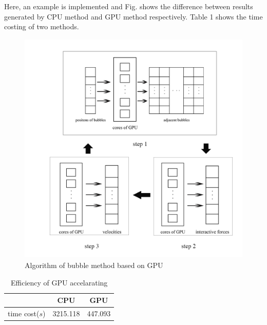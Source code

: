 \documentclass[a4paper, 11pt, final]{article}
\begin{document}
Here, an example is implemented and Fig. shows the difference between results
generated by CPU method and GPU method respectively. Table 1 shows the time costing
of two methods.

\begin{figure}[htbp]
    \centering
    
        \begin{minipage}[top]{320pt}
            \centering
            \includegraphics[width=320pt,height=320pt]{./pictures/huizong.png}
        \end{minipage}
    \caption{Algorithm of bubble method based on GPU}
    \label{fig:huizong}
\end{figure}
\begin{table}[htbp]
    \centering
    \caption{Efficiency of GPU accelarating}
    \begin{tabular}[c]{ccc}
        \toprule
                        & CPU           & GPU \\
        \midrule
        time cost($s$)    & 3215.118      & 447.093 \\
        \bottomrule
    \end{tabular}
\end{table}
\end{document}
